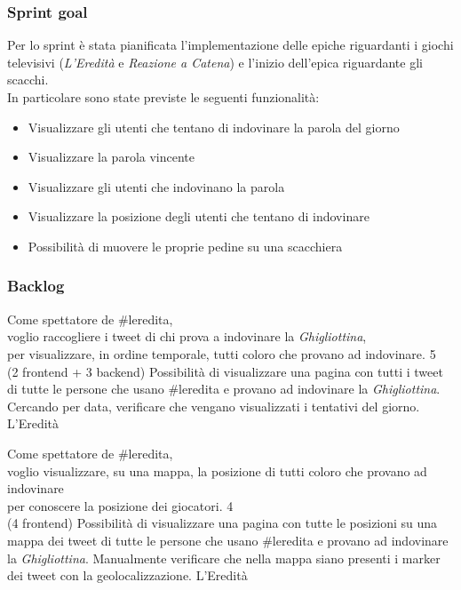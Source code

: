 \subsubsection{Sprint goal}
Per lo sprint è stata pianificata l'implementazione delle epiche riguardanti i giochi televisivi (\textit{L'Eredità} e \textit{Reazione a Catena}) e
l'inizio dell'epica riguardante gli scacchi.\\
In particolare sono state previste le seguenti funzionalità:
\begin{itemize}
    \item Visualizzare gli utenti che tentano di indovinare la parola del giorno
    \item Visualizzare la parola vincente
    \item Visualizzare gli utenti che indovinano la parola
    \item Visualizzare la posizione degli utenti che tentano di indovinare
    \item Possibilità di muovere le proprie pedine su una scacchiera
\end{itemize}


\subsubsection{Backlog}
\userstory%
{Come spettatore de \#leredita,\\voglio raccogliere i tweet di chi prova a indovinare la \textit{Ghigliottina},\\per visualizzare, in ordine temporale, tutti coloro che provano ad indovinare.}%
{5\\(2 frontend + 3 backend)}%
{Possibilità di visualizzare una pagina con tutti i tweet di tutte le persone che usano \#leredita e provano ad indovinare la \textit{Ghigliottina}.}%
{Cercando per data, verificare che vengano visualizzati i tentativi del giorno.}
{L'Eredità}

\userstory%
{Come spettatore de \#leredita,\\voglio visualizzare, su una mappa, la posizione di tutti coloro che provano ad indovinare\\per conoscere la posizione dei giocatori.}%
{4\\(4 frontend)}%
{Possibilità di visualizzare una pagina con tutte le posizioni su una mappa dei tweet di tutte le persone che usano \#leredita e provano ad indovinare la \textit{Ghigliottina}.}%
{Manualmente verificare che nella mappa siano presenti i marker dei tweet con la geolocalizzazione.}
{L'Eredità}

